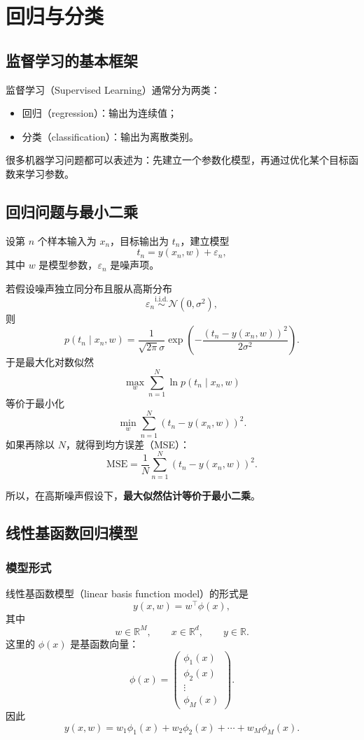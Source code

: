 \newpage
\chapter{回归与分类}

\section{监督学习的基本框架}

监督学习（Supervised Learning）通常分为两类：

\begin{itemize}
    \item 回归（regression）：输出为连续值；
    \item 分类（classification）：输出为离散类别。
\end{itemize}

很多机器学习问题都可以表述为：先建立一个参数化模型，再通过优化某个目标函数来学习参数。

\section{回归问题与最小二乘}

设第 $n$ 个样本输入为 $x_n$，目标输出为 $t_n$，建立模型
\[
t_n = y(x_n,w) + \varepsilon_n,
\]
其中 $w$ 是模型参数，$\varepsilon_n$ 是噪声项。

若假设噪声独立同分布且服从高斯分布
\[
\varepsilon_n \overset{\mathrm{i.i.d.}}{\sim} \mathcal{N}(0,\sigma^2),
\]
则
\[
p(t_n\mid x_n,w)
=
\frac{1}{\sqrt{2\pi}\sigma}
\exp\!\left(
-\frac{(t_n-y(x_n,w))^2}{2\sigma^2}
\right).
\] 
于是最大化对数似然
\[
\max_w \sum_{n=1}^N \ln p(t_n\mid x_n,w)
\]
等价于最小化
\[
\min_w \sum_{n=1}^N (t_n-y(x_n,w))^2.
\]
如果再除以 $N$，就得到均方误差（MSE）：
\[
\mathrm{MSE}
=
\frac{1}{N}\sum_{n=1}^N (t_n-y(x_n,w))^2.
\]

所以，在高斯噪声假设下，\textbf{最大似然估计等价于最小二乘}。

\section{线性基函数回归模型}

\subsection{模型形式}

线性基函数模型（linear basis function model）的形式是
\[
y(x,w)=w^{\top}\phi(x),
\]
其中
\[
w\in\mathbb{R}^M,\qquad x\in\mathbb{R}^d,\qquad y\in\mathbb{R}.
\]
这里的 $\phi(x)$ 是基函数向量：
\[
\phi(x)=
\begin{pmatrix}
\phi_1(x)\\
\phi_2(x)\\
\vdots\\
\phi_M(x)
\end{pmatrix}.
\]
因此
\[
y(x,w)=w_1\phi_1(x)+w_2\phi_2(x)+\cdots+w_M\phi_M(x).
\]

